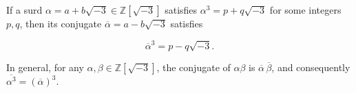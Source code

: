 If a surd $\alpha = a + b\sqrt{-3} \in \mathbb{Z}[\sqrt{-3}]$ satisfies $\alpha^3 = p + q\sqrt{-3}$ for some integers $p, q$, then its conjugate $\overline{\alpha} = a - b\sqrt{-3}$ satisfies

$$
\overline{\alpha}^3 = p - q\sqrt{-3}.
$$

In general, for any $\alpha, \beta \in \mathbb{Z}[\sqrt{-3}]$, the conjugate of $\alpha\beta$ is $\overline{\alpha}\,\overline{\beta}$, and consequently $\overline{\alpha^3} = (\overline{\alpha})^3$.
